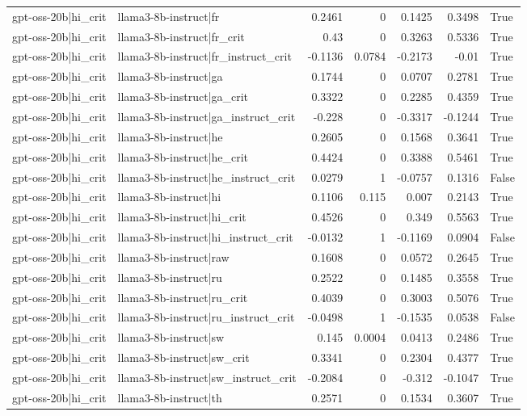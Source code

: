 \begin{table}
\begin{tabular}{l l r r r r l}
gpt-oss-20b|hi_crit & llama3-8b-instruct|fr & 0.2461 & 0 & 0.1425 & 0.3498 & True \\
gpt-oss-20b|hi_crit & llama3-8b-instruct|fr_crit & 0.43 & 0 & 0.3263 & 0.5336 & True \\
gpt-oss-20b|hi_crit & llama3-8b-instruct|fr_instruct_crit & -0.1136 & 0.0784 & -0.2173 & -0.01 & True \\
gpt-oss-20b|hi_crit & llama3-8b-instruct|ga & 0.1744 & 0 & 0.0707 & 0.2781 & True \\
gpt-oss-20b|hi_crit & llama3-8b-instruct|ga_crit & 0.3322 & 0 & 0.2285 & 0.4359 & True \\
gpt-oss-20b|hi_crit & llama3-8b-instruct|ga_instruct_crit & -0.228 & 0 & -0.3317 & -0.1244 & True \\
gpt-oss-20b|hi_crit & llama3-8b-instruct|he & 0.2605 & 0 & 0.1568 & 0.3641 & True \\
gpt-oss-20b|hi_crit & llama3-8b-instruct|he_crit & 0.4424 & 0 & 0.3388 & 0.5461 & True \\
gpt-oss-20b|hi_crit & llama3-8b-instruct|he_instruct_crit & 0.0279 & 1 & -0.0757 & 0.1316 & False \\
gpt-oss-20b|hi_crit & llama3-8b-instruct|hi & 0.1106 & 0.115 & 0.007 & 0.2143 & True \\
gpt-oss-20b|hi_crit & llama3-8b-instruct|hi_crit & 0.4526 & 0 & 0.349 & 0.5563 & True \\
gpt-oss-20b|hi_crit & llama3-8b-instruct|hi_instruct_crit & -0.0132 & 1 & -0.1169 & 0.0904 & False \\
gpt-oss-20b|hi_crit & llama3-8b-instruct|raw & 0.1608 & 0 & 0.0572 & 0.2645 & True \\
gpt-oss-20b|hi_crit & llama3-8b-instruct|ru & 0.2522 & 0 & 0.1485 & 0.3558 & True \\
gpt-oss-20b|hi_crit & llama3-8b-instruct|ru_crit & 0.4039 & 0 & 0.3003 & 0.5076 & True \\
gpt-oss-20b|hi_crit & llama3-8b-instruct|ru_instruct_crit & -0.0498 & 1 & -0.1535 & 0.0538 & False \\
gpt-oss-20b|hi_crit & llama3-8b-instruct|sw & 0.145 & 0.0004 & 0.0413 & 0.2486 & True \\
gpt-oss-20b|hi_crit & llama3-8b-instruct|sw_crit & 0.3341 & 0 & 0.2304 & 0.4377 & True \\
gpt-oss-20b|hi_crit & llama3-8b-instruct|sw_instruct_crit & -0.2084 & 0 & -0.312 & -0.1047 & True \\
gpt-oss-20b|hi_crit & llama3-8b-instruct|th & 0.2571 & 0 & 0.1534 & 0.3607 & True \\

\end{tabular}
\end{table}

